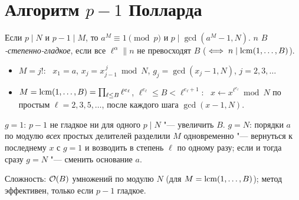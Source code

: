 \documentclass{ca-handout}
\begin{document}
\section{Алгоритм \texorpdfstring{$p - 1$}{p - 1} Полларда}
Если $p \mid N$ и $p - 1 \mid M$, то $a^M \equiv 1 \pmod p$ и $p \mid \gcd(a^M - 1, N)$.
$n$ \emph{$B$-степенно-гладкое}, если все $\ell^\alpha \parallel n$ не превосходят $B$
($\iff n \mid \operatorname{lcm}(1, \dots, B)$).

\begin{reminder}[title={Два варианта показателя}]
\begin{itemize}
  \item $M = j!$: \ $x_1 = a$, $x_j = x_{j-1}^{\,j} \bmod N$, $g_j = \gcd(x_j - 1, N)$,
    $j = 2, 3, \dots$
  \item $M = \operatorname{lcm}(1, \dots, B) = \prod_{\ell \le B} \ell^{e_\ell}$, $\ell^{e_\ell} \le B < \ell^{e_\ell + 1}$:
    \ $x \gets x^{\ell^{e_\ell}} \bmod N$ по простым $\ell = 2, 3, 5, \dots$, после каждого шага
    $\gcd(x - 1, N)$.
\end{itemize}
\end{reminder}

\begin{reminder}[title={Неудачи}]
$g = 1$: $p - 1$ не гладкое ни для одного $p \mid N$ "--- увеличить $B$.
$g = N$: порядки $a$ по модулю \emph{всех} простых делителей разделили $M$ одновременно "---
вернуться к последнему $x$ с $g = 1$ и возводить в степень $\ell$ по одному разу; если и
тогда сразу $g = N$ "--- сменить основание $a$.
\end{reminder}
Сложность: $\mathcal{O}(B)$ умножений по модулю $N$ (для $M = \operatorname{lcm}(1, \dots, B)$); метод
эффективен, только если $p - 1$ гладкое.
\end{document}

